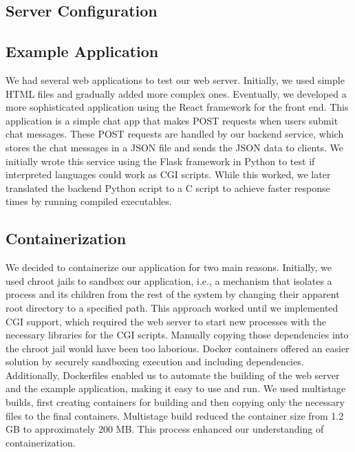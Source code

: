 \subsection*{Server Configuration}


\subsection*{Example Application}

We had several web applications to test our web server. Initially, we used simple HTML files and gradually added more complex ones. Eventually, we developed a more sophisticated application using the React framework for the front end. This application is a simple chat app that makes POST requests when users submit chat messages. These POST requests are handled by our backend service, which stores the chat messages in a JSON file and sends the JSON data to clients. We initially wrote this service using the Flask framework in Python to test if interpreted languages could work as CGI scripts. While this worked, we later translated the backend Python script to a C script to achieve faster response times by running compiled executables.

\subsection*{Containerization}

We decided to containerize our application for two main reasons. Initially, we used chroot jails to sandbox our application, i.e., a mechanism that isolates a process and its children from the rest of the system by changing their apparent root directory to a specified path. This approach worked until we implemented CGI support, which required the web server to start new processes with the necessary libraries for the CGI scripts. Manually copying those dependencies into the chroot jail would have been too laborious. Docker containers offered an easier solution by securely sandboxing execution and including dependencies. Additionally, Dockerfiles enabled us to automate the building of the web server and the example application, making it easy to use and run. We used multistage builds, first creating containers for building and then copying only the necessary files to the final containers. Multistage build reduced the container size from 1.2 GB to approximately 200 MB. This process enhanced our understanding of containerization.
